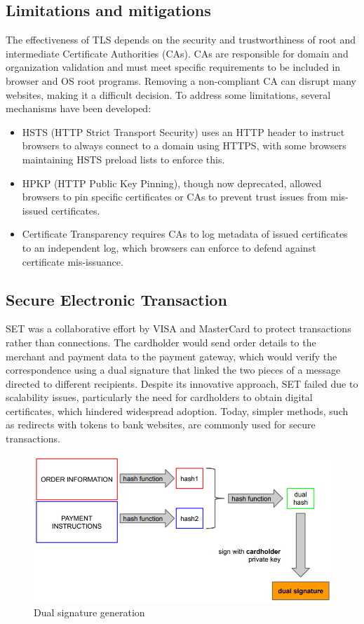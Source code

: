 \subsection{Limitations and mitigations}
The effectiveness of TLS depends on the security and trustworthiness of root and intermediate Certificate Authorities (CAs). 
CAs are responsible for domain and organization validation and must meet specific requirements to be included in browser and OS root programs. 
Removing a non-compliant CA can disrupt many websites, making it a difficult decision.
To address some limitations, several mechanisms have been developed: 
\begin{itemize}
    \item HSTS (HTTP Strict Transport Security) uses an HTTP header to instruct browsers to always connect to a domain using HTTPS, with some browsers maintaining HSTS preload lists to enforce this. 
    \item  HPKP (HTTP Public Key Pinning), though now deprecated, allowed browsers to pin specific certificates or CAs to prevent trust issues from mis-issued certificates. 
    \item Certificate Transparency requires CAs to log metadata of issued certificates to an independent log, which browsers can enforce to defend against certificate mis-issuance.
\end{itemize}

\subsection{Secure Electronic Transaction}
SET was a collaborative effort by VISA and MasterCard to protect transactions rather than connections. 
The cardholder would send order details to the merchant and payment data to the payment gateway, which would verify the correspondence using a dual signature that linked the two pieces of a message directed to different recipients.
Despite its innovative approach, SET failed due to scalability issues, particularly the need for cardholders to obtain digital certificates, which hindered widespread adoption. 
Today, simpler methods, such as redirects with tokens to bank websites, are commonly used for secure transactions.
\begin{figure}[H]
    \centering
    \includegraphics[width=0.75\linewidth]{images/dsg.png}
    \caption{Dual signature generation}
\end{figure}